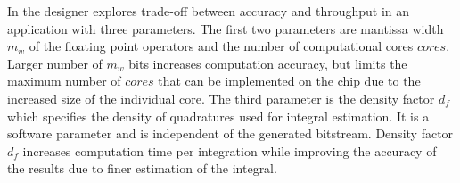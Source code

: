 \documentclass[runningheads,a4paper]{llncs}
\begin{document}
%
% 

In \cite{Anson2012Quad} the designer explores trade-off between accuracy and throughput in an application with three parameters. The first two parameters are mantissa width $m_{w}$ of the floating point operators and the number of computational cores $cores$. Larger number of $m_{w}$ bits increases computation accuracy, but limits the maximum number of $cores$ that can be implemented on the chip due to the increased size of the individual core. The third parameter is the density factor $d_{f}$ which specifies the density of quadratures used for integral estimation. It is a software parameter and is independent of the generated bitstream. Density factor $d_{f}$ increases computation time per integration while improving the accuracy of the results due to finer estimation of the integral. 

\end{document}

